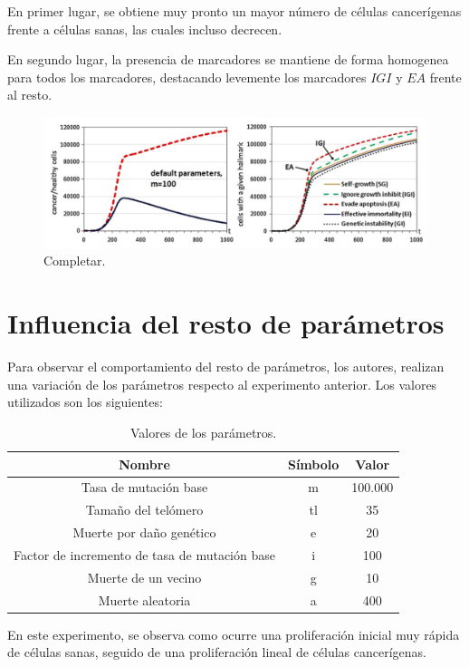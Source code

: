 En primer lugar, se obtiene muy pronto un mayor número de células cancerígenas
frente a células sanas, las cuales incluso decrecen.

En segundo lugar, la presencia de marcadores se mantiene de forma homogenea para todos
los marcadores, destacando levemente los marcadores $IGI$ y $EA$ frente al resto.

\begin{figure}[h]
\centering
\includegraphics[scale=0.6]{figures/experiments/exp3}
\caption{Completar.}
\end{figure}

\section{Influencia del resto de parámetros}

Para observar el comportamiento del resto de parámetros, los autores, realizan una variación
de los parámetros respecto al experimento anterior. Los valores utilizados son los siguientes:

\begin{table}[h!]
  \centering
  \caption{Valores de los parámetros.}
  \label{tab:table1}
  \begin{tabular}{ccc}
    \toprule
    Nombre & Símbolo & Valor\\
    \midrule
    Tasa de mutación base & m & 100.000\\
    Tamaño del telómero & tl & 35\\
    Muerte por daño genético & e & 20\\
    Factor de incremento de tasa de mutación base & i & 100\\
    Muerte de un vecino & g & 10\\
    Muerte aleatoria & a & 400\\
    \bottomrule
  \end{tabular}
\end{table}

En este experimento, se observa como ocurre una proliferación inicial muy rápida
de células sanas, seguido de una proliferación lineal de células cancerígenas.

